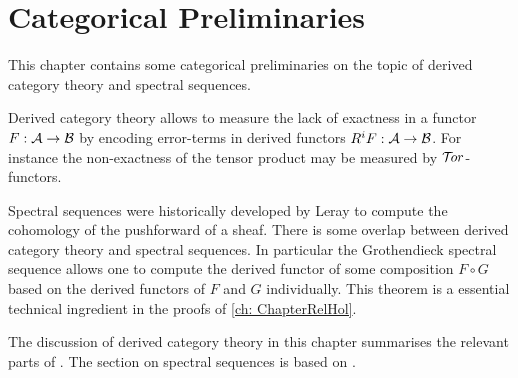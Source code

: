 \chapter{Categorical Preliminaries}\label{ch: ChapterCategory}
This chapter contains some categorical preliminaries on the topic of derived category theory and spectral sequences.

Derived category theory allows to measure the lack of exactness in a functor $F:\AA \to \mathcal{B}$ by encoding error-terms in derived functors $R^iF:\AA \to \mathcal{B}$.
For instance the non-exactness of the tensor product may be measured by $\Tor$-functors.

Spectral sequences were historically developed by Leray to compute the cohomology of the pushforward of a sheaf.
There is some overlap between derived category theory and spectral sequences.
In particular the Grothendieck spectral sequence allows one to compute the derived functor of some composition $F\circ G$ based on the derived functors of $F$ and $G$ individually.
This theorem is a essential technical ingredient in the proofs of \cref{ch: ChapterRelHol}.

The discussion of derived category theory in this chapter summarises the relevant parts of \cite[Chapters 1, 2 and 5]{dimca2004sheaves}.
The section on spectral sequences is based on \cite{weibel1995introduction}.

